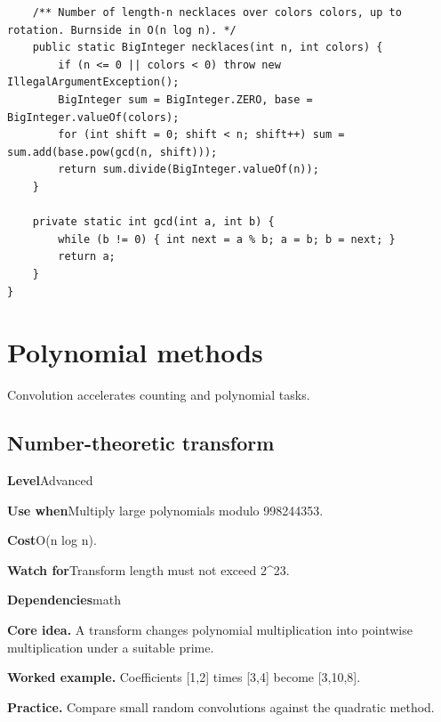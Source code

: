 \documentclass[10pt,letterpaper]{article}
\newcommand{\entrylabel}[1]{\textcolor{accent}{\bfseries #1}}
\begin{document}
\begin{lstlisting}
    /** Number of length-n necklaces over colors colors, up to rotation. Burnside in O(n log n). */
    public static BigInteger necklaces(int n, int colors) {
        if (n <= 0 || colors < 0) throw new IllegalArgumentException();
        BigInteger sum = BigInteger.ZERO, base = BigInteger.valueOf(colors);
        for (int shift = 0; shift < n; shift++) sum = sum.add(base.pow(gcd(n, shift)));
        return sum.divide(BigInteger.valueOf(n));
    }

    private static int gcd(int a, int b) {
        while (b != 0) { int next = a % b; a = b; b = next; }
        return a;
    }
}
\end{lstlisting}
\section{Polynomial methods}
\begin{guidebox}Convolution accelerates counting and polynomial tasks.\end{guidebox}
\subsection{Number-theoretic transform}
\begin{guidebox}\small
\entrylabel{Level}\quad Advanced\par
\entrylabel{Use when}\quad Multiply large polynomials modulo 998244353.\par
\entrylabel{Cost}\quad O(n log n).\par
\entrylabel{Watch for}\quad Transform length must not exceed 2\textasciicircum{}23.\par
\entrylabel{Dependencies}\quad math\par
\end{guidebox}
\noindent\textbf{Core idea.} A transform changes polynomial multiplication into pointwise multiplication under a suitable prime.\par
\noindent\textbf{Worked example.} Coefficients [1,2] times [3,4] become [3,10,8].\par
\noindent\textbf{Practice.} Compare small random convolutions against the quadratic method.\par
\end{document}
